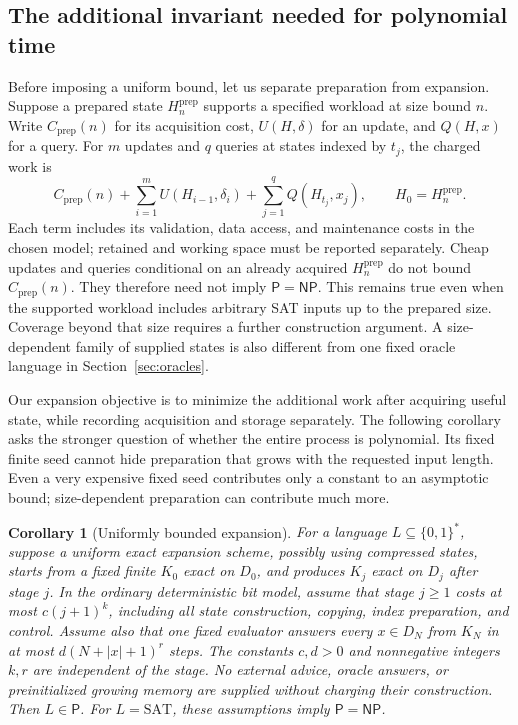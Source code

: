 \documentclass[11pt,a4paper]{article}
\numberwithin{equation}{section}
\newcommand{\Pclass}{\mathsf{P}}
\newcommand{\NPclass}{\mathsf{NP}}
\newcommand{\SAT}{\mathrm{SAT}}
\newcommand{\bits}{\{0,1\}}
\theoremstyle{plain}
\newtheorem{corollary}[lemma]{Corollary}
\theoremstyle{definition}
\theoremstyle{remark}
\begin{document}
\subsection{The additional invariant needed for polynomial time}

Before imposing a uniform bound, let us separate preparation from expansion. Suppose a prepared state $H^{\mathrm{prep}}_n$ supports a specified workload at size bound $n$. Write $C_{\mathrm{prep}}(n)$ for its acquisition cost, $U(H,\delta)$ for an update, and $Q(H,x)$ for a query. For $m$ updates and $q$ queries at states indexed by $t_j$, the charged work is
\begin{equation}
C_{\mathrm{prep}}(n)+\sum_{i=1}^{m}U(H_{i-1},\delta_i)
  +\sum_{j=1}^{q}Q(H_{t_j},x_j),\qquad H_0=H^{\mathrm{prep}}_n.
\label{eq:prepared-expansion-cost}
\end{equation}
Each term includes its validation, data access, and maintenance costs in the chosen model; retained and working space must be reported separately. Cheap updates and queries conditional on an already acquired $H^{\mathrm{prep}}_n$ do not bound $C_{\mathrm{prep}}(n)$. They therefore need not imply $\Pclass=\NPclass$. This remains true even when the supported workload includes arbitrary SAT inputs up to the prepared size. Coverage beyond that size requires a further construction argument. A size-dependent family of supplied states is also different from one fixed oracle language in Section~\ref{sec:oracles}.

Our expansion objective is to minimize the additional work after acquiring useful state, while recording acquisition and storage separately. The following corollary asks the stronger question of whether the entire process is polynomial. Its fixed finite seed cannot hide preparation that grows with the requested input length. Even a very expensive fixed seed contributes only a constant to an asymptotic bound; size-dependent preparation can contribute much more.

\begin{corollary}[Uniformly bounded expansion]
\label{cor:polynomial-expansion}
For a language $L\subseteq\bits^*$, suppose a uniform exact expansion scheme, possibly using compressed states, starts from a fixed finite $K_0$ exact on $D_0$, and produces $K_j$ exact on $D_j$ after stage $j$. In the ordinary deterministic bit model, assume that stage $j\geq1$ costs at most $c(j+1)^k$, including all state construction, copying, index preparation, and control. Assume also that one fixed evaluator answers every $x\in D_N$ from $K_N$ in at most $d(N+|x|+1)^r$ steps. The constants $c,d>0$ and nonnegative integers $k,r$ are independent of the stage. No external advice, oracle answers, or preinitialized growing memory are supplied without charging their construction. Then $L\in\Pclass$. For $L=\SAT$, these assumptions imply $\Pclass=\NPclass$.
\end{corollary}
\end{document}
